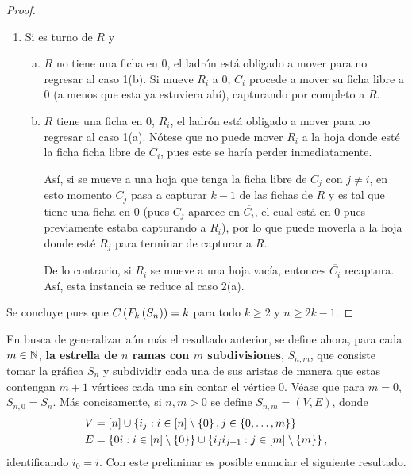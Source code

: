 \begin{proof}
\begin{enumerate}
        \item Si es turno de $R$ y
        \begin{enumerate}[(a)]
            \item $R$ no tiene una ficha en $0$, el ladr\'on est\'a obligado a
            mover para no regresar al caso 1(b). Si mueve $R_i$ a $0$, $C_i$
            procede a mover su ficha libre a $0$ (a menos que esta ya estuviera
            ah\'i), capturando por completo a $R$.
            
            \item $R$ tiene una ficha en $0$, $R_i$, el ladr\'on est\'a obligado
            a mover para no regresar al caso 1(a). N\'otese que no puede mover
            $R_i$ a la hoja donde est\'e la ficha ficha libre de $C_i$, pues
            este se har\'ia perder inmediatamente.
            
            As\'i, si se mueve a una hoja que tenga la ficha libre de $C_j$ con
            $j\neq i$, en esto momento $C_j$ pasa a capturar $k-1$ de las fichas
            de $R$ y es tal que tiene una ficha en $0$ (pues $C_j$ aparece en
            $\overline{C_i}$, el cual est\'a en $0$ pues previamente estaba
            capturando a $R_i$), por lo que puede moverla a la hoja donde est\'e
            $R_j$ para terminar de capturar a $R$.

            De lo contrario, si $R_i$ se mueve a una hoja vac\'ia, entonces
            $\overline{C_i}$ recaptura. As\'i, esta instancia se reduce al caso
            2(a).
        \end{enumerate}
    \end{enumerate}
    Se concluye pues que $C\left( F_k\left( S_n\right)\right)=k$ para todo $k\geq 2$ y
    $n\geq 2k-1$.
    
    
\end{proof}

En busca de generalizar a\'un m\'as el resultado anterior, se define ahora, para
cada $m\in \mathbb{N}$, \textbf{la estrella de $n$ ramas con $m$ subdivisiones},
$S_{n,m}$, que consiste tomar la gr\'afica $S_n$ y subdividir cada una de sus
aristas de manera que estas contengan $m+1$ v\'ertices cada una sin contar el
v\'ertice $0$. V\'ease que para $m=0$, $S_{n,0}=S_n$. M\'as concisamente, si
$n,m > 0$ se define $S_{n,m}=(V,E)$, donde
\begin{align*}
    V &=\left[ n\right]\cup\left\{ i_j: i\in\left[ n\right]\setminus \left\{ 0\right\} , j\in \left\{ 0,\dots, m\right\}\right\} \\
    E &=\left\{ 0i : i\in \left[ n\right]\setminus\left\{ 0\right\}\right\} \cup \left\{ i_ji_{j+1}:j\in\left[ m\right]\setminus\left\{ m\right\}\right\},
\end{align*}
identificando $i_0=i$. Con este preliminar es posible enunciar el siguiente
resultado.

